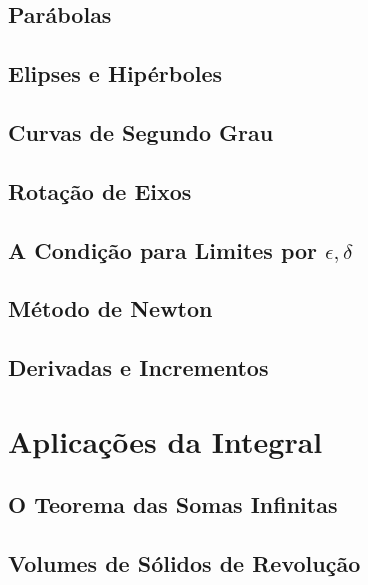 \documentclass{svmono}
\begin{document}
\section{Parábolas}
\label{sec:parabolas}

\section{Elipses e Hipérboles}
\label{sec:ellipses}

\section{Curvas de Segundo Grau}
\label{sec:seconddegcurves}

\section{Rotação de Eixos}
\label{sec:rotationaxes}

\section{A Condição para Limites por $\epsilon, \delta$}
\label{sec:epsilondelta}

\section{Método de Newton}
\label{sec:newtonmethod}

\section{Derivadas e Incrementos}
\label{sec:derivsinc}

\chapterproblems

\chapter{Aplicações da Integral}
\label{chp:applint}

\section{O Teorema das Somas Infinitas}
\label{sec:infsumtheo}

\section{Volumes de Sólidos de Revolução}
\label{sec:solidrev}
\end{document}
